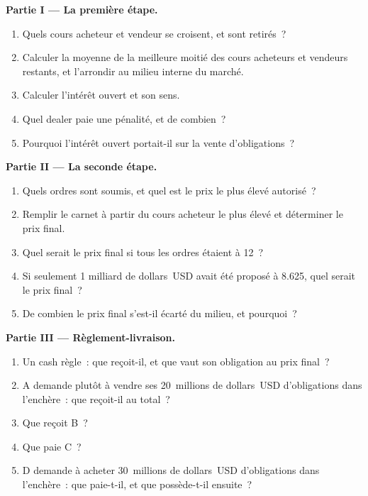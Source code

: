 \begin{problem}
\medskip\noindent\textbf{Partie I --- La première étape.}
\begin{enumerate}
\item Quels cours acheteur et vendeur se croisent, et sont retirés~?
\item Calculer la moyenne de la meilleure moitié des cours acheteurs et vendeurs restants, et l'arrondir au
milieu interne du marché.
\item Calculer l'intérêt ouvert et son sens.
\item Quel dealer paie une pénalité, et de combien~?
\item Pourquoi l'intérêt ouvert portait-il sur la vente d'obligations~?
\end{enumerate}

\medskip\noindent\textbf{Partie II --- La seconde étape.}
\begin{enumerate}[resume]
\item Quels ordres sont soumis, et quel est le prix le plus élevé autorisé~?
\item Remplir le carnet à partir du cours acheteur le plus élevé et déterminer le prix final.
\item Quel serait le prix final si tous les ordres étaient à 12~?
\item Si seulement 1 milliard de dollars~USD avait été proposé à 8.625, quel serait le prix final~?
\item De combien le prix final s'est-il écarté du milieu, et pourquoi~?
\end{enumerate}

\medskip\noindent\textbf{Partie III --- Règlement-livraison.}
\begin{enumerate}[resume]
\item Un cash règle~: que reçoit-il, et que vaut son obligation au
prix final~?
\item A demande plutôt à vendre ses 20~millions de dollars~USD d'obligations dans l'enchère~: que
reçoit-il au total~?
\item Que reçoit B~?
\item Que paie C~?
\item D demande à acheter 30~millions de dollars~USD d'obligations dans l'enchère~: que paie-t-il, et que
possède-t-il ensuite~?
\end{enumerate}


\end{problem}
